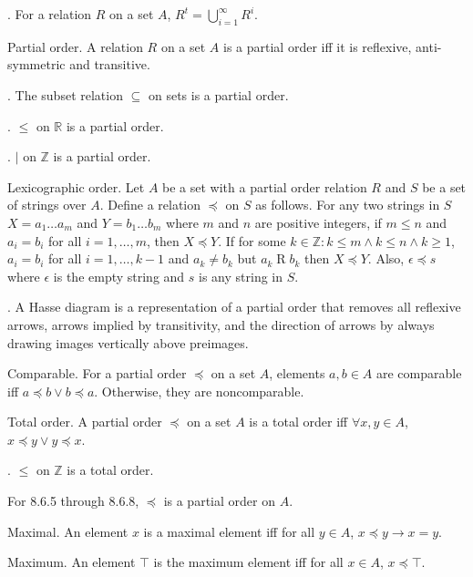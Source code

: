 \documentclass{slnotes}
\begin{document}
. For a relation \(R\) on a set \(A\), \(R^t = \bigcup^\infty_{i=1}R^i\).

 Partial order. A relation \(R\) on a set \(A\) is a partial order iff it is reflexive, anti-symmetric and transitive.

. The subset relation \(\subseteq\) on sets is a partial order.

. \(\le\) on \(\mathbb{R}\) is a partial order.

. \(\mid\) on \(\mathbb{Z}\) is a partial order.

 Lexicographic order. Let \(A\) be a set with a partial order relation \(R\) and \(S\) be a set of strings over \(A\). Define a relation \(\preceq\) on \(S\) as follows. For any two strings in \(S\) \(X = a_1\hdots a_m\) and \(Y = b_1\hdots b_m\) where \(m\) and \(n\) are positive integers, if \(m \le n\) and \(a_i = b_i\) for all \(i = 1, \hdots, m\), then \(X \preceq Y\). If for some \(k \in \mathbb{Z} : k \le m \land k \le n \land k \ge 1\), \(a_i = b_i\) for all \(i = 1, \hdots, k - 1\) and \(a_k \neq b_k\) but \(a_k \mathrel{R} b_k\) then \(X \preceq Y\). Also, \(\epsilon \preceq s\) where \(\epsilon\) is the empty string and \(s\) is any string in \(S\).

. A Hasse diagram is a representation of a partial order that removes all reflexive arrows, arrows implied by transitivity, and the direction of arrows by always drawing images vertically above preimages.

 Comparable. For a partial order \(\preceq\) on a set \(A\), elements \(a, b \in A\) are comparable iff \(a \preceq b \lor b \preceq a\). Otherwise, they are noncomparable.

 Total order. A partial order \(\preceq\) on a set \(A\) is a total order iff \(\forall x, y \in A\), \(x \preceq y \lor y \preceq x\).

. \(\le\) on \(\mathbb{Z}\) is a total order.

For 8.6.5 through 8.6.8, \(\preceq\) is a partial order on \(A\).

 Maximal. An element \(x\) is a maximal element iff for all \(y \in A\), \(x \preceq y \to x = y\).

 Maximum. An element \(\top\) is the maximum element iff for all \(x \in A\), \(x \preceq \top\).
\end{document}
